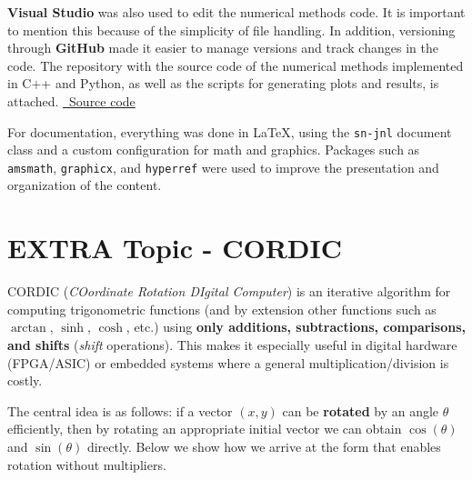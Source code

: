 \documentclass[pdflatex,sn-mathphys-num]{sn-jnl}%
\begin{document}
\textbf{Visual Studio} was also used to edit the numerical methods code. It is important to mention this because of the simplicity of file handling. In addition, versioning through \textbf{GitHub} made it easier to manage versions and track changes in the code. The repository with the source code of the numerical methods implemented in C++ and Python, as well as the scripts for generating plots and results, is attached.
\href{https://github.com/DasReyxr/C-Cpp/tree/main/Metodos/3ExamenTrapecioRaltson}{\faGithub\ Source code}



For documentation, everything was done in \LaTeX, using the \texttt{sn-jnl} document class and a custom configuration for math and graphics. Packages such as \texttt{amsmath}, \texttt{graphicx}, and \texttt{hyperref} were used to improve the presentation and organization of the content.

\newpage
\section{EXTRA Topic - CORDIC}
CORDIC (\textit{COordinate Rotation DIgital Computer}) is an iterative algorithm for computing trigonometric functions (and by extension other functions such as $\arctan$, $\sinh$, $\cosh$, etc.) using \textbf{only additions, subtractions, comparisons, and shifts} (\textit{shift} operations). This makes it especially useful in digital hardware (FPGA/ASIC) or embedded systems where a general multiplication/division is costly.

The central idea is as follows: if a vector $(x,y)$ can be \textbf{rotated} by an angle $\theta$ efficiently, then by rotating an appropriate initial vector we can obtain $\cos(\theta)$ and $\sin(\theta)$ directly. Below we show how we arrive at the form that enables rotation without multipliers.
\end{document}

